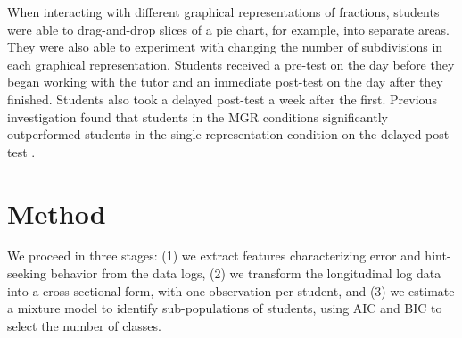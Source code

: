 \documentclass{edm_template}
\begin{document}
When interacting with different graphical representations of fractions, students were able to drag-and-drop slices of a pie chart, for example, into separate areas. They were also able to experiment with changing the number of subdivisions in each graphical representation. Students received a pre-test on the day before they began working with the tutor and an immediate post-test on the day after they finished. Students also took a delayed post-test a week after the first. Previous investigation found that students in the MGR conditions significantly outperformed students in the single representation condition on the delayed post-test \cite{Rau2012,Rau2012b}. 


 
\section{Method}
\label{sec:method}

We proceed in three stages: (1) we extract features characterizing error and hint-seeking behavior from the data logs, (2) we transform the longitudinal log data into a cross-sectional form, with one observation per student, and (3) we estimate a mixture model to identify sub-populations of students, using AIC and BIC to select the number of classes. 
\end{document}
